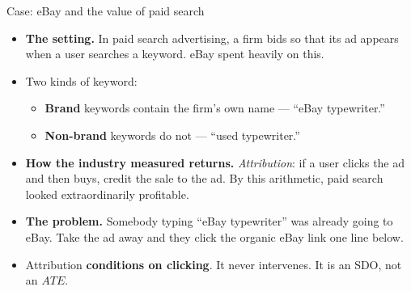 \documentclass[
  11pt,
  ignorenonframetext,
  aspectratio=169,
]{beamer}
\providecommand{\tightlist}{%
  \setlength{\itemsep}{0pt}\setlength{\parskip}{0pt}}
\begin{document}
\begin{frame}{Case: eBay and the value of paid search}
\protect{}\label{case-ebay-and-the-value-of-paid-search}
\begin{itemize}
\tightlist
\item
  \textbf{The setting.} In paid search advertising, a firm bids so that
  its ad appears when a user searches a keyword. eBay spent heavily on
  this.
\item
  Two kinds of keyword:

  \begin{itemize}
  \tightlist
  \item
    \textbf{Brand} keywords contain the firm's own name --- ``eBay
    typewriter.''
  \item
    \textbf{Non-brand} keywords do not --- ``used typewriter.''
  \end{itemize}
\item
  \textbf{How the industry measured returns.} \emph{Attribution}: if a
  user clicks the ad and then buys, credit the sale to the ad. By this
  arithmetic, paid search looked extraordinarily profitable.
\item
  \textbf{The problem.} Somebody typing ``eBay typewriter'' was already
  going to eBay. Take the ad away and they click the organic eBay link
  one line below.
\item
  Attribution \textbf{conditions on clicking}. It never intervenes. It
  is an SDO, not an \(ATE\).
\end{itemize}
\end{frame}
\end{document}
